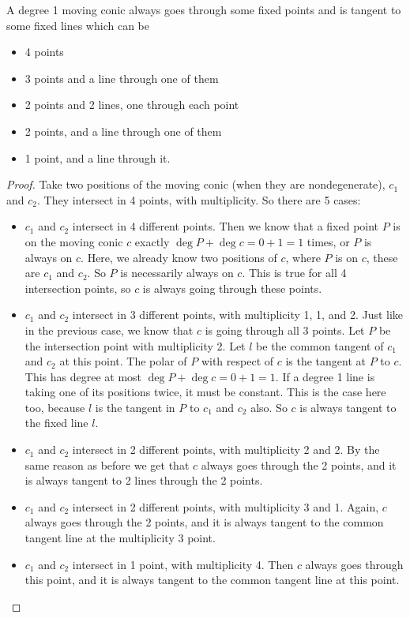 \documentclass[a4paper]{article}
\begin{document}
\begin{corollary}
    A degree 1 moving conic always goes through some fixed points and is tangent to some fixed lines which can be
    \begin{itemize}
        \item 4 points
        \item 3 points and a line through one of them
        \item 2 points and 2 lines, one through each point
        \item 2 points, and a line through one of them
        \item 1 point, and a line through it.
    \end{itemize}
\end{corollary}
\begin{proof}
    Take two positions of the moving conic (when they are nondegenerate), $c_1$ and $c_2$. They intersect in 4 points, with multiplicity. So there are 5 cases:
    \begin{itemize}
        \item $c_1$ and $c_2$ intersect in 4 different points. Then we know that a fixed point $P$ is on the moving conic $c$ exactly $\deg P+\deg c=0+1=1$ times, or $P$ is always on $c$. Here, we already know two positions of $c$, where $P$ is on $c$, these are $c_1$ and $c_2$. So $P$ is necessarily always on $c$. This is true for all 4 intersection points, so $c$ is always going through these points.
        \item $c_1$ and $c_2$ intersect in 3 different points, with multiplicity 1, 1, and 2. Just like in the previous case, we know that $c$ is going through all 3 points. Let $P$ be the intersection point with multiplicity 2. Let $l$ be the common tangent of $c_1$ and $c_2$ at this point. The polar of $P$ with respect of $c$ is the tangent at $P$ to $c$. This has degree at most $\deg P + \deg c=0+1=1$. If a degree 1 line is taking one of its positions twice, it must be constant. This is the case here too, because $l$ is the tangent in $P$ to $c_1$ and $c_2$ also. So $c$ is always tangent to the fixed line $l$.
        \item $c_1$ and $c_2$ intersect in 2 different points, with multiplicity 2 and 2. By the same reason as before we get that $c$ always goes through the 2 points, and it is always tangent to 2 lines through the 2 points.
        \item $c_1$ and $c_2$ intersect in 2 different points, with multiplicity 3 and 1. Again, $c$ always goes through the 2 points, and it is always tangent to the common tangent line at the multiplicity 3 point.
        \item $c_1$ and $c_2$ intersect in 1 point, with multiplicity 4. Then $c$ always goes through this point, and it is always tangent to the common tangent line at this point.
    \end{itemize}
\end{proof}
\end{document}
